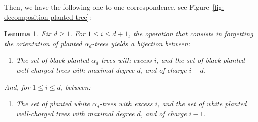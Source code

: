 \documentclass[11pt,reqno,tbtags]{amsart}
\newtheorem{lemm}[theo]{Lemma}
\numberwithin{equation}{section}
\numberwithin{theo}{section}
\theoremstyle{definition}
\begin{document}
Then, we have the following one-to-one correspondence, see Figure~\ref{fig: decomposition planted tree}:
\begin{lemm}\label{lemm: Charge-Excess correspondence}
Fix $d\geq 1$. For $1\leq i\leq d+1$, the operation that consists in forgetting the orientation of planted $\alpha_d$-trees yields a bijection between:
\begin{enumerate}
	\item[1.] The set of black planted $\alpha_d$-trees with excess $i$, and the set of black planted well-charged trees with maximal degree $d$, and of charge $i-d$.  
\end{enumerate}
And, for $1\leq i\leq d$, between:
\begin{enumerate}
 	\item[2.]  The set of planted white $\alpha_d$-trees with excess $i$, and the set of white planted well-charged trees with maximal degree $d$, and of charge $i-1$.   
\end{enumerate}
\end{lemm}
\end{document}
